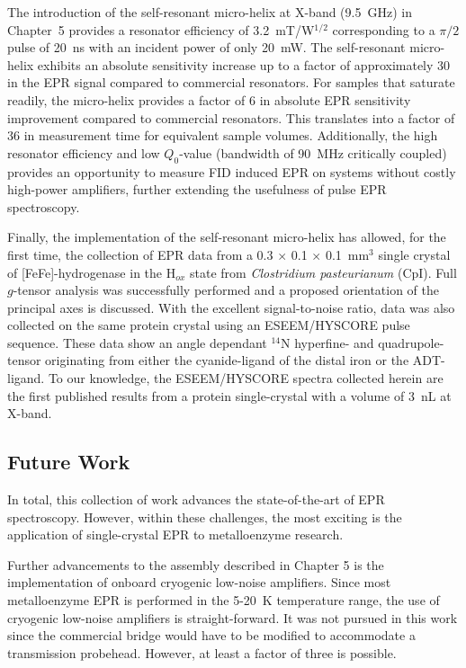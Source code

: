 The introduction of the self-resonant micro-helix at X-band (9.5~GHz) in Chapter~5 provides a resonator efficiency of 3.2~mT/W$^{1/2}$ corresponding to a $\pi/2$ pulse of 20~ns with an incident power of only 20~mW. The self-resonant micro-helix exhibits an absolute sensitivity increase up to a factor of approximately 30 in the EPR signal compared to commercial resonators. For samples that saturate readily, the micro-helix provides a factor of 6 in absolute EPR sensitivity improvement compared to commercial resonators. This translates into a factor of 36 in measurement time for equivalent sample volumes. Additionally, the high resonator efficiency and low $Q_0$-value (bandwidth of 90~MHz critically coupled) provides an opportunity to measure FID induced EPR on systems without costly high-power amplifiers, further extending the usefulness of pulse EPR spectroscopy.

Finally, the implementation of the self-resonant micro-helix has allowed, for the first time, the collection of EPR data from a 0.3 $\times$ 0.1 $\times$ 0.1~mm$^3$ single crystal of [FeFe]-hydrogenase in the H$_{ox}$ state from {\em Clostridium pasteurianum} (CpI). Full $g$-tensor analysis was successfully performed and a proposed orientation of the principal axes is discussed. With the excellent signal-to-noise ratio, data was also collected on the same protein crystal using an ESEEM/HYSCORE pulse sequence. These data show an angle dependant $^{14}$N hyperfine- and quadrupole-tensor originating from either the cyanide-ligand of the distal iron or the ADT-ligand.  To our knowledge, the ESEEM/HYSCORE spectra collected herein are the first published results from a protein single-crystal with a volume of 3~nL at X-band. 

\subsection{Future Work}

In total, this collection of work advances the state-of-the-art of EPR spectroscopy. However, within these challenges, the most exciting is the application of single-crystal EPR to metalloenzyme research.

Further advancements to the assembly described in Chapter 5 is the implementation of onboard cryogenic low-noise amplifiers. Since most metalloenzyme EPR is performed in the 5-20~K temperature range, the use of cryogenic low-noise amplifiers is straight-forward. It was not pursued in this work since the commercial bridge would have to be modified to accommodate a transmission probehead. However, at least a factor of three is possible. \cite{NARKOWICZ201379} 


